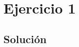 \documentclass[11pt]{article}
\begin{document}
\section*{Ejercicio 1}


\subsection*{Solución}

\end{document}
